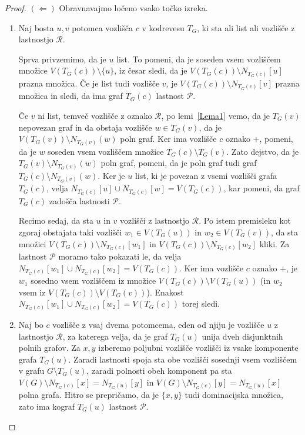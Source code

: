 \documentclass[12pt,a4paper,twoside]{article}
\theoremstyle{definition} %
\theoremstyle{plain} %
\numberwithin{equation}{section}  %
\begin{document}
\begin{proof}
\medskip
\noindent$(\Leftarrow)$ Obravnavajmo ločeno vsako točko izreka.
\begin{enumerate}[label=($\roman*$)]
\item Naj bosta $u,v$ potomca vozlišča $c$ v kodrevesu $T_G$, ki sta ali list ali vozlišče z lastnostjo $\mathcal{R}$.

Sprva privzemimo, da je $u$ list. To pomeni, da je soseden vsem vozliščem množice $V(T_G(c)) \setminus \{u\}$, iz česar sledi, da je $V(T_G(c)) \setminus N_{T_G(c)}[u]$ prazna množica. Če je list tudi vozlišče $v$, je $V(T_G(c)) \setminus N_{T_G(c)}[v]$ prazna množica in sledi, da ima graf $T_G(c)$ lastnost $\mathcal{P}$.

Če $v$ ni list, temveč vozlišče z oznako $\mathcal{R}$, po lemi~\ref{Lema1} vemo, da je $T_G(v)$ nepovezan graf in da obstaja vozlišče $w \in T_G(v)$, da je $V(T_G(v)) \setminus N_{T_G(v)}(w)$ poln graf. Ker ima vozlišče $c$ oznako $+$, pomeni, da je $w$ soseden vsem vozliščem množice $T_G(c) \setminus T_G(v)$. Zato dejstvo, da je $T_G(v) \setminus N_{T_G(v)}(w)$ poln graf, pomeni, da je poln graf tudi graf $T_G(c) \setminus N_{T_G(v)}(w)$. Ker je $u$ list, ki je povezan z vsemi vozlišči grafa $T_G(c)$, velja $N_{T_G(c)}[u] \cup N_{T_G(c)}[w] = V(T_G(c))$, kar pomeni, da graf $T_G(c)$ zadošča lastnosti $\mathcal{P}$.

Recimo sedaj, da sta $u$ in $v$ vozlišči z lastnostjo $\mathcal{R}$. Po istem premisleku kot zgoraj obstajata taki vozlišči $w_1 \in V(T_G(u))$ in $w_2 \in V(T_G(v))$, da sta množici $V(T_G(c)) \setminus N_{T_G(c)}[w_1]$ in $V(T_G(c)) \setminus N_{T_G(c)}[w_2]$ kliki. Za lastnost $\mathcal{P}$ moramo tako pokazati le, da velja $N_{T_G(c)}[w_1] \cup N_{T_G(c)}[w_2] = V(T_G(c))$. Ker ima vozlišče $c$ oznako $+$, je $w_1$ sosedno vsem vozliščem  iz množice $V(T_G(c)) \setminus V(T_G(u))$ (in $w_2$ vsem iz $V(T_G(c)) \setminus V(T_G(v))$). Enakost $N_{T_G(c)}[w_1] \cup N_{T_G(c)}[w_2] = V(T_G(c))$ torej sledi.

\item Naj bo $c$ vozlišče z vsaj dvema potomcema, eden od njiju je vozlišče $u$ z lastnostjo $\mathcal{R}$, za katerega velja, da je graf $T_G(u)$ unija dveh disjunktnih polnih grafov. Za $x,y$ izberemo poljubni vozlišče vozlišči iz vsake komponente grafa $T_G(u)$. Zaradi lastnosti spoja sta obe vozlišči sosednji vsem vozliščem v grafu $G \setminus T_G(u)$, zaradi polnosti obeh komponent pa sta  $V(G) \setminus N_{T_G(c)}[x] = N_{T_G(u)}[y]$ in $V(G) \setminus N_{T_G(c)}[y] = N_{T_G(u)}[x]$ polna grafa. Hitro se prepričamo, da je $\{x, y\}$ tudi dominacijska množica, zato ima kograf $T_G(u)$ lastnost $\mathcal{P}$.\qedhere
\end{enumerate}
\end{proof}
\end{document}
